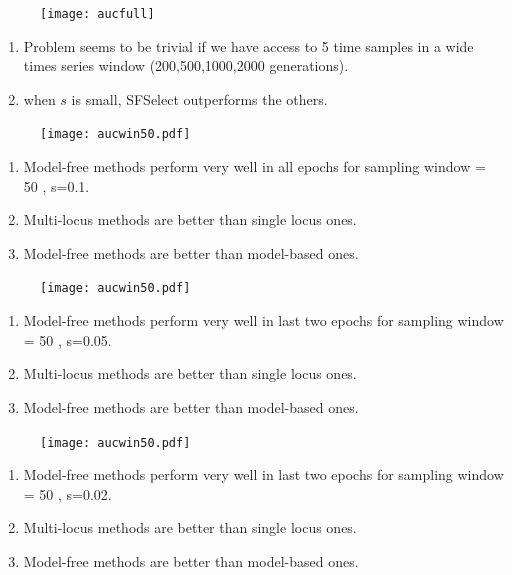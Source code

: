 \documentclass[t]{beamer} %
\begin{document}
\begin{figure}[H]
  \centering
  		    \texttt{[image: aucfull]}
\end{figure}
{\tiny \begin{enumerate}
\item Problem seems to be trivial if we have access to 5 time samples in a wide times series window (200,500,1000,2000 generations).
\item when $s$ is small, SFSelect outperforms the others.
\end{enumerate}}




\begin{figure}[H]
  \centering
  		    \texttt{[image: aucwin50.pdf]}
\end{figure}
{\tiny \begin{enumerate}
\item Model-free methods perform very well in all epochs for sampling window = 50 , s=0.1.
\item Multi-locus methods are better than single locus ones.
\item Model-free methods are better than model-based ones.
\end{enumerate}}

\begin{figure}[H]
  \centering
  		    \texttt{[image: aucwin50.pdf]}
\end{figure}
{\tiny \begin{enumerate}
\item Model-free methods perform very well in last two epochs for sampling window = 50 , s=0.05.
\item Multi-locus methods are better than single locus ones.
\item Model-free methods are better than model-based ones.
\end{enumerate}}


\begin{figure}[H]
  \centering
  		    \texttt{[image: aucwin50.pdf]}
\end{figure}
{\tiny \begin{enumerate}
\item Model-free methods perform very well in last two epochs for sampling window = 50 , s=0.02.
\item Multi-locus methods are better than single locus ones.
\item Model-free methods are better than model-based ones.
\end{enumerate}}
\end{document}
